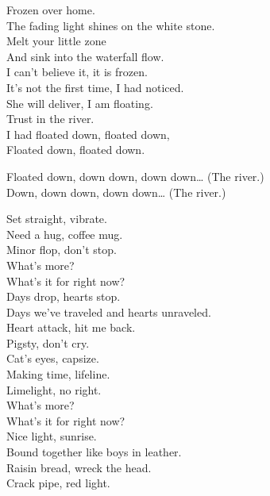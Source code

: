 Frozen over home. \\
The fading light shines on the white stone. \\
Melt your little zone \\
And sink into the waterfall flow. \\

I can't believe it, it is frozen. \\
It's not the first time, I had noticed. \\
She will deliver, I am floating. \\
Trust in the river. \\
I had floated down, floated down, \\
Floated down, floated down. \\


Floated down, down down, down down… (The river.) \\
Down, down down, down down… (The river.) \\




Set straight, vibrate. \\
Need a hug, coffee mug. \\
Minor flop, don't stop. \\

What's more? \\
What's it for right now? \\

Days drop, hearts stop. \\
Days we've traveled and hearts unraveled. \\
Heart attack, hit me back. \\
Pigsty, don't cry. \\

Cat's eyes, capsize. \\
Making time, lifeline. \\
Limelight, no right. \\

What's more? \\
What's it for right now? \\

Nice light, sunrise. \\
Bound together like boys in leather. \\
Raisin bread, wreck the head. \\
Crack pipe, red light. \\


